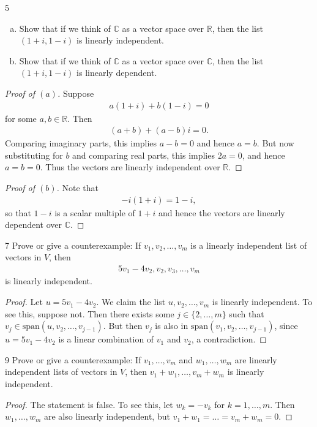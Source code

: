 \documentclass{extarticle}
\newenvironment{problem}[1]{\begin{prob*}{#1}{}}{\end{prob*}}
\newcommand{\R}{\mathbb{R}}
\newcommand{\C}{\mathbb{C}}
\newcommand{\Span}{\mathrm{span}}
\begin{document}
\begin{problem}{5}
\begin{enumerate}[(a)]
\item Show that if we think of $\C$ as a vector space over $\R$, then the list $(1 + i, 1 - i)$ is linearly independent.
\item Show that if we think of $\C$ as a vector space over $\C$, then the list $(1+ i, 1- i)$ is linearly dependent.
\end{enumerate}
\end{problem}
\begin{proof}[Proof of $(a)$]
Suppose 
\begin{align*}
a(1 + i) + b(1 - i) = 0
\end{align*}
for some $a,b\in\R$.  Then
\begin{align*}
(a + b) + (a - b)i = 0.
\end{align*}
Comparing imaginary parts, this implies $a-b = 0$ and hence $a=b$.  But now substituting for $b$ and comparing real parts, this implies $2a = 0$, and hence $a=b=0$.  Thus the vectors are linearly independent over $\R$.
\end{proof}
\begin{proof}[Proof of $(b)$]
Note that 
\begin{align*}
-i(1+ i) = 1 - i,
\end{align*}
so that $1-i$ is a scalar multiple of $1+i$ and hence the vectors are linearly dependent over $\C$.
\end{proof}

\begin{problem}{7}
Prove or give a counterexample: If $v_1,v_2,\dots, v_m$ is a linearly independent list of vectors in $V$, then
\begin{align*}
5v_1-4v_2, v_2, v_3, \dots, v_m
\end{align*}
is linearly independent.
\end{problem}
\begin{proof}
Let $u = 5v_1-4v_2$.  We claim the list $u, v_2, \dots, v_m$ is linearly independent.  To see this, suppose not.  Then there exists some $j\in \{2,\dots, m\}$ such that $v_j\in \Span(u, v_2, \dots, v_{j-1})$.  But then $v_j$ is also in $\Span(v_1, v_2,\dots, v_{j-1})$, since $u = 5v_1-4v_2$ is a linear combination of $v_1$ and $v_2$, a contradiction.
\end{proof}

\begin{problem}{9}
Prove or give a counterexample: If $v_1,\dots,v_m$ and $w_1,\dots, w_m$ are linearly independent lists of vectors in $V$, then $v_1+w_1, \dots, v_m + w_m$ is linearly independent.
\end{problem}
\begin{proof}
The statement is false.  To see this, let $w_k = -v_k$ for $k=1,\dots, m$.  Then $w_1,\dots, w_m$ are also linearly independent, but $v_1+w_1 = \dots = v_m + w_m = 0$.
\end{proof}
\end{document}
